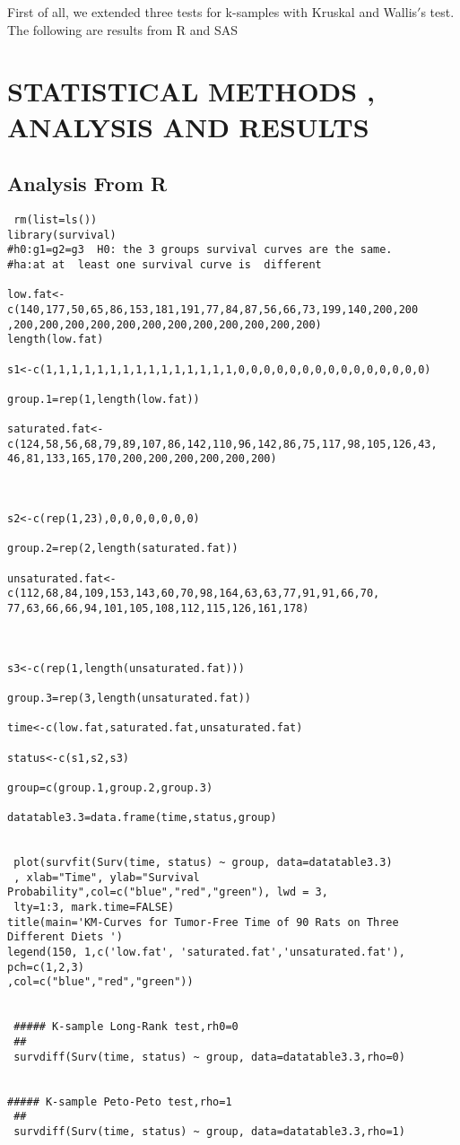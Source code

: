 \documentclass[11pt]{article}
\numberwithin{figure}{section}
\begin{document}
First of all, we extended three tests for k-samples with Kruskal and Wallis$'$s test. The following are results from R and SAS


\section{STATISTICAL METHODS , ANALYSIS AND RESULTS}
\subsection{Analysis From R}
%
\begin{verbatim}
 rm(list=ls())
library(survival)
#h0:g1=g2=g3  H0: the 3 groups survival curves are the same.
#ha:at at  least one survival curve is  different

low.fat<-c(140,177,50,65,86,153,181,191,77,84,87,56,66,73,199,140,200,200
,200,200,200,200,200,200,200,200,200,200,200,200)
length(low.fat)

s1<-c(1,1,1,1,1,1,1,1,1,1,1,1,1,1,1,0,0,0,0,0,0,0,0,0,0,0,0,0,0,0)

group.1=rep(1,length(low.fat))

saturated.fat<-c(124,58,56,68,79,89,107,86,142,110,96,142,86,75,117,98,105,126,43,
46,81,133,165,170,200,200,200,200,200,200)



s2<-c(rep(1,23),0,0,0,0,0,0,0)

group.2=rep(2,length(saturated.fat))

unsaturated.fat<-c(112,68,84,109,153,143,60,70,98,164,63,63,77,91,91,66,70,
77,63,66,66,94,101,105,108,112,115,126,161,178)



s3<-c(rep(1,length(unsaturated.fat)))

group.3=rep(3,length(unsaturated.fat))

time<-c(low.fat,saturated.fat,unsaturated.fat)

status<-c(s1,s2,s3)

group=c(group.1,group.2,group.3)

datatable3.3=data.frame(time,status,group)

 
 plot(survfit(Surv(time, status) ~ group, data=datatable3.3)
 , xlab="Time", ylab="Survival Probability",col=c("blue","red","green"), lwd = 3,
 lty=1:3, mark.time=FALSE)
title(main='KM-Curves for Tumor-Free Time of 90 Rats on Three Different Diets ') 
legend(150, 1,c('low.fat', 'saturated.fat','unsaturated.fat'), pch=c(1,2,3) 
,col=c("blue","red","green"))


 ##### K-sample Long-Rank test,rh0=0
 ##
 survdiff(Surv(time, status) ~ group, data=datatable3.3,rho=0)


##### K-sample Peto-Peto test,rho=1
 ##
 survdiff(Surv(time, status) ~ group, data=datatable3.3,rho=1)


\end{verbatim}
\end{document}
